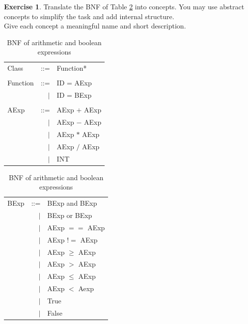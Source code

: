 \documentclass[a4paper,oneside,DIV8,10pt]{scrartcl}
\theoremstyle{definition}
\newtheorem{aufgabe}[satz]{Exercise}
\begin{document}
	\begin{aufgabe}
		Translate the BNF of Table \ref{table:bnf} into concepts. You may use abstract concepts to simplify the task and add internal structure.\\
		Give each concept a meaningful name and short description.
		\begin{table}
			\begin{tabular}{ l r l }
				Class & ::= & Function*\\
				\\
				Function & ::= & ID = AExp\\
				& $|$ & ID = BExp \\
				\\
				AExp & ::= & AExp $+$ AExp\\
					 & $|$ & AExp $-$ AExp\\
					 & $|$ & AExp $*$ AExp\\
					 & $|$ & AExp $/$ AExp\\
					 & $|$ & INT\\
			\end{tabular}
			\begin{tabular}{ l r l }
			BExp & ::= & BExp and BExp \\
			& $|$ & BExp or BExp\\
			& $|$ & AExp $==$ AExp\\
			& $|$ & AExp $!=$ AExp\\
			& $|$ & AExp $\geq$ AExp\\
			& $|$ & AExp $>$ AExp\\
			& $|$ & AExp $\leq$ AExp\\
			& $|$ & AExp $<$ Aexp\\
			& $|$ & True \\
			& $|$ & False \\
		\end{tabular}
	\caption{BNF of arithmetic and boolean expressions}
	\label{table:bnf}
		\end{table}
	\end{aufgabe}


\end{document}
